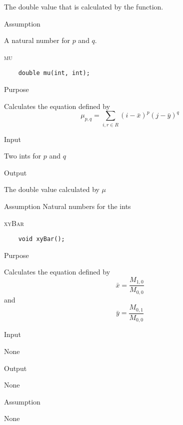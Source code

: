 \documentclass[pdftex, 11pt]{article}
\begin{document}
\begin{description}
\begin{description}
				The double value that is calculated by the function.				

			\item{Assumption}

				A natural number for $p$ and $q$.

		\end{description}

	\item{\textsc{mu}}
		\begin{description}
\begin{lstlisting}
	double mu(int, int);
\end{lstlisting}

			\item{Purpose}

				Calculates the equation defined by
				\[
				\mu_{p,q} = \sum_{i,r \in R} (i-\bar{x})^p (j-\bar{y})^q
				\]

			\item{Input}
				
				Two ints for $p$ and $q$

			\item{Output}

				The double value calculated by $\mu$

			\item{Assumption}
				Natural numbers for the ints

		\end{description}

	\item{\textsc{xyBar}}
		\begin{description}
\begin{lstlisting}
	void xyBar();
\end{lstlisting}

			\item{Purpose}

				Calculates the equation defined by 
				\[
				\bar{x} = \frac{M_{1,0}}{M_{0,0}}
				\]
				and 
				\[
				\bar{y} = \frac{M_{0,1}}{M_{0,0}}
				\]

			\item{Input}
			
				None

			\item{Output}

				None

			\item{Assumption}

				None

		\end{description}


\end{description}
\end{document}
